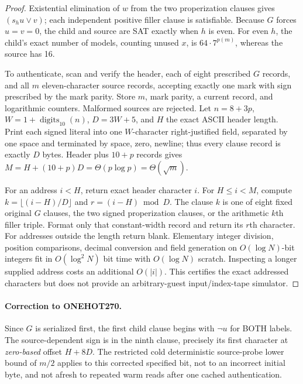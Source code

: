 \documentclass[11pt]{article}
\begin{document}
\begin{proof}
Existential elimination of $w$ from the two properization clauses gives $(s_hu\vee v)$; each independent positive filler clause is satisfiable. Because $G$ forces $u=v=0$, the child and source are SAT exactly when $h$ is even. For even $h$, the child's exact number of models, counting unused $x$, is $64\cdot7^{p(m)}$, whereas the source has 16.

To authenticate, scan and verify the header, each of eight prescribed $G$ records, and all $m$ eleven-character source records, accepting exactly one mark with sign prescribed by the mark parity. Store $m$, mark parity, a current record, and logarithmic counters. Malformed sources are rejected. Let $n=8+3p$, $W=1+\operatorname{digits}_{10}(n)$, $D=3W+5$, and $H$ the exact ASCII header length. Print each signed literal into one $W$-character right-justified field, separated by one space and terminated by space, zero, newline; thus every clause record is exactly $D$ bytes. Header plus $10+p$ records gives $M=H+(10+p)D=\Theta(p\log p)=\Theta(\sqrt m)$.

For an address $i<H$, return exact header character $i$. For $H\le i<M$, compute $k=\lfloor(i-H)/D\rfloor$ and $r=(i-H)\bmod D$. The clause $k$ is one of eight fixed original $G$ clauses, the two signed properization clauses, or the arithmetic $k$th filler triple. Format only that constant-width record and return its $r$th character. For addresses outside the length return blank. Elementary integer division, position comparisons, decimal conversion and field generation on $O(\log N)$-bit integers fit in $O(\log^2N)$ bit time with $O(\log N)$ scratch. Inspecting a longer supplied address costs an additional $O(|i|)$. This certifies the exact addressed characters but does not provide an arbitrary-guest input/index-tape simulator.
\end{proof}

\paragraph{Correction to ONEHOT270.}
Since $G$ is serialized first, the first child clause begins with $\neg u$ for BOTH labels. The source-dependent sign is in the ninth clause, precisely its first character at \emph{zero-based} offset $H+8D$. The restricted cold deterministic source-probe lower bound of $m/2$ applies to this corrected specified bit, not to an incorrect initial byte, and not afresh to repeated warm reads after one cached authentication.
\end{document}
